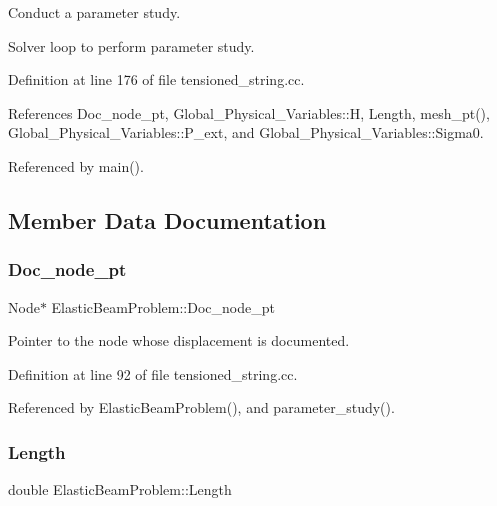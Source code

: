 Conduct a parameter study. 

Solver loop to perform parameter study. 

Definition at line 176 of file tensioned\+\_\+string.\+cc.



References Doc\+\_\+node\+\_\+pt, Global\+\_\+\+Physical\+\_\+\+Variables\+::H, Length, mesh\+\_\+pt(), Global\+\_\+\+Physical\+\_\+\+Variables\+::\+P\+\_\+ext, and Global\+\_\+\+Physical\+\_\+\+Variables\+::\+Sigma0.



Referenced by main().



\subsection{Member Data Documentation}
\mbox{\label{classElasticBeamProblem_a9c96cab7e71243e51f7c4040a84cdd5d}} 
\subsubsection{\texorpdfstring{Doc\+\_\+node\+\_\+pt}{Doc\_node\_pt}}
{\footnotesize\ttfamily Node$\ast$ Elastic\+Beam\+Problem\+::\+Doc\+\_\+node\+\_\+pt\hspace{0.3cm}{\ttfamily [private]}}



Pointer to the node whose displacement is documented. 



Definition at line 92 of file tensioned\+\_\+string.\+cc.



Referenced by Elastic\+Beam\+Problem(), and parameter\+\_\+study().

\mbox{\label{classElasticBeamProblem_aa68b1c77e0aa1571fe956d62bd8cf096}} 
\subsubsection{\texorpdfstring{Length}{Length}}
{\footnotesize\ttfamily double Elastic\+Beam\+Problem\+::\+Length\hspace{0.3cm}{\ttfamily [private]}}



